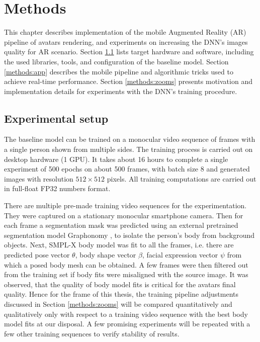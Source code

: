 \chapter{Methods}\label{chapter:methods}

This chapter describes implementation of the mobile Augmented Reality (AR) pipeline of avatars rendering, and experiments on increasing the DNN's \cite{dnn:stylepeople21} images quality for AR scenario. Section \ref{methods:dev-setup} lists target hardware and software, including the used libraries, tools, and configuration of the baseline model. Section \ref{methods:app} describes the mobile pipeline and algorithmic tricks used to achieve real-time performance. Section \ref{methods:zooms} presents motivation and implementation details for experiments with the DNN's training procedure.

\section{Experimental setup}\label{methods:dev-setup}

The baseline \cite{dnn:stylepeople21} model can be trained on a monocular video sequence of frames with a single person shown from multiple sides.  The training process is carried out on desktop hardware (1 GPU). It takes about 16 hours to complete a single experiment of 500 epochs on about 500 frames, with batch size 8 and generated images with resolution $512 \times 512$ pixels. All training computations are carried out in full-float FP32 numbers format.

There are multiple pre-made training video sequences for the experimentation. They were captured on a stationary monocular smartphone camera. Then for each frame a segmentation mask was predicted using an external pretrained segmentation model Graphonomy \cite{dnn:graphonomy19}, to isolate the person's body from background objects. Next, SMPL-X \cite{dnn:smplx19} body model was fit to all the frames, i.e. there are predicted pose vector $\theta$, body shape vector $\beta$, facial expression vector $\psi$ from which a posed body mesh can be obtained. A few frames were then filtered out from the training set if body fits were misaligned with the source image. It was observed, that the quality of body model fits is critical for the avatars final quality. Hence for the frame of this thesis, the training pipeline adjustments discussed in Section \ref{methods:zooms} will be compared quantitatively and qualitatively only with respect to a training video sequence with the best body model fits at our disposal. A few promising experiments will be repeated with a few other training sequences to verify stability of results. 

